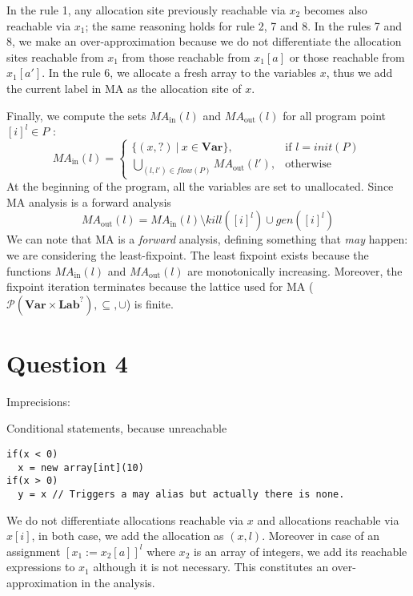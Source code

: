 \documentclass{article}
\begin{document}
In the rule 1, any allocation site previously reachable via \(x_2\) becomes also reachable via \(x_1\); the same reasoning holds for rule 2, 7 and 8.
In the rules 7 and 8, we make an over-approximation because we do not differentiate the allocation sites reachable from \(x_1\) from those reachable from \(x_1[a]\) or those reachable from \(x_1[a']\).
In the rule 6, we allocate a fresh array to the variables \(x\), thus we add the current label in MA as the allocation site of \(x\).

Finally, we compute the sets \(M\!A_\text{in}(l)\) and \(M\!A_\text{out}(l)\) for all program point \([i]^l \in P\) :
 \[
    M\!A_\text{in}(l) =
    \begin{cases}
      \{(x,?)\ |\ x \in \textbf{Var}\},                        & \text{if } l=init(P)\\
      \bigcup\limits_{(l,l') \in flow(P)} M\!A_\text{out}(l'), & \text{otherwise}
    \end{cases}
\]
At the beginning of the program, all the variables are set to unallocated. Since MA analysis is a forward analysis
\[
    M\!A_\text{out}(l) = M\!A_\text{in}(l) \setminus kill([i]^l) \cup gen([i]^l)
\]
We can note that MA is a {\em forward} analysis, defining something that {\em may} happen: we are considering the least-fixpoint.
The least fixpoint exists because the functions \(M\!A_\text{in}(l)\) and \(M\!A_\text{out}(l)\) are monotonically increasing.
Moreover, the fixpoint iteration terminates because the lattice used for MA (\(\mathcal{P}(\textbf{Var} \times \textbf{Lab}^?), \subseteq, \cup\)) is finite.

\section*{Question 4}
Imprecisions:

Conditional statements, because unreachable 
\begin{lstlisting}
if(x < 0)
  x = new array[int](10)
if(x > 0)
  y = x // Triggers a may alias but actually there is none.
\end{lstlisting}

We do not differentiate allocations reachable via \(x\) and allocations reachable via \(x[i]\), in both case, we add the allocation as \((x,l)\).
Moreover in case of an assignment \([x_1 := x_2[a]]^l\) where \(x_2\) is an array of integers, we add its reachable expressions to \(x_1\) although it is not necessary.
This constitutes an over-approximation in the analysis.
\end{document}
